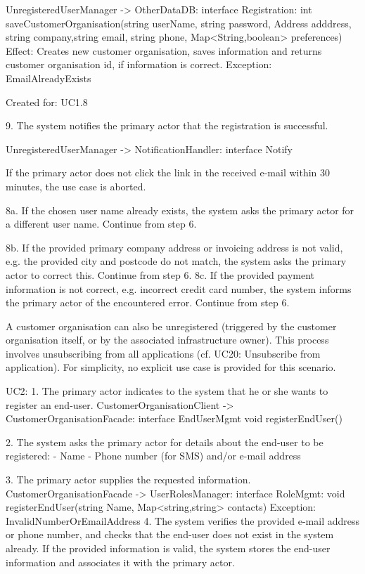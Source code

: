             
        UnregisteredUserManager -> OtherDataDB: interface Registration:
                                  int saveCustomerOrganisation(string userName, string password, Address adddress, string company,string    
                                  email, string phone, Map<String,boolean> preferences)
             Effect: Creates new customer organisation, saves information and returns customer organisation id, if information is correct.
             Exception: EmailAlreadyExists
            \item Created for: UC1.8
            
    9. The system notifies the primary actor that the registration is successful.
           
        UnregisteredUserManager -> NotificationHandler: interface Notify 
        
    If the primary actor does not click the link in the received e-mail within 30 minutes, the use
    case is aborted.


    8a. If the chosen user name already exists, the system asks the primary actor for a different user
        name. Continue from step 6.

    8b. If the provided primary company address or invoicing address is not valid, e.g. the provided
        city and postcode do not match, the system asks the primary actor to correct this. Continue
        from step 6.
    8c. If the provided payment information is not correct, e.g. incorrect credit card number, the
        system informs the primary actor of the encountered error. Continue from step 6.
        
    A customer organisation can also be unregistered (triggered by the customer organisation
    itself, or by the associated infrastructure owner). This process involves unsubscribing from all
    applications (cf. UC20: Unsubscribe from application). For simplicity, no explicit use case is
    provided for this scenario.

    UC2: 
        1. The primary actor indicates to the system that he or she wants to register an end-user.
            CustomerOrganisationClient -> CustomerOrganisationFacade: interface EndUserMgmt
                                            void registerEndUser()

        2. The system asks the primary actor for details about the end-user to be registered:
            - Name
            - Phone number (for SMS) and/or e-mail address
       
        3. The primary actor supplies the requested information.
            CustomerOrganisationFacade -> UserRolesManager: interface RoleMgmt:
                                                void registerEndUser(string Name, Map<string,string> contacts)
            Exception: InvalidNumberOrEmailAddress
        4. The system verifies the provided e-mail address or phone number, and checks that the end-user
            does not exist in the system already. If the provided information is valid, the system stores
            the end-user information and associates it with the primary actor.
        
